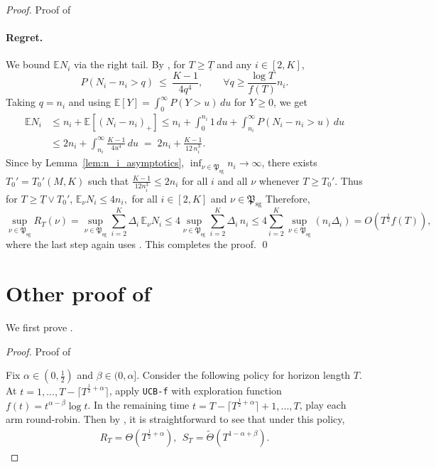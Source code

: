 \documentclass[nonblindrev]{informs3_noinforms}
\newcommand{\E}{{\mathbb{E}}}
\begin{document}
\begin{proof}{Proof of }
\paragraph{Regret.}
We bound $\E N_i$ via the right tail. By , for $T\ge \underline T$ and
any $i\in[2, K]$,
\[
P(N_i-n_i>q)\ \le\ \frac{K-1}{4q^4},
\qquad \forall q\ge \frac{\log T}{f(T)}n_i.
\]
Taking $q=n_i$ and using $\E[Y]=\int_0^\infty P(Y>u)\,du$ for $Y\ge 0$, we get
\begin{align*}
\E N_i
&\le n_i + \E[(N_i-n_i)_+]
 \le n_i + \int_0^{n_i} 1\,du + \int_{n_i}^{\infty} P(N_i-n_i>u)\,du \\
&\le 2n_i + \int_{n_i}^{\infty} \frac{K-1}{4u^4}\,du  \;=\;2n_i + \frac{K-1}{12\,n_i^3}.
\end{align*}
Since by Lemma~\ref{lem:n_i_asymptotics}, $\inf_{\nu\in\mathfrak{P}_{\text{sg}}}n_i\to\infty$, there exists $T_0'=T_0'( M, K)$ such that $\frac{K-1}{12n_i^3}\le 2n_i$ for all $i$ and all $\nu$ whenever $T\ge T_0'$. Thus for $T\ge \underline T\vee T_0'$, $\E_{\nu} N_i \le 4n_i,$ for all $i\in[2, K]$ and $\nu \in \mathfrak{P}_{\text{sg}}$ Therefore,
\[
\sup_{\nu\in\mathfrak{P}_{\text{sg}}} R_T(\nu)
=\sup_{\nu\in\mathfrak{P}_{\text{sg}}}\sum_{i=2}^K \Delta_i\,\E_{\nu} N_i
\le 4\sup_{\nu\in\mathfrak{P}_{\text{sg}}}\sum_{i=2}^K \Delta_i\,n_i
\le 4\sum_{i=2}^K \sup_{\nu\in\mathfrak{P}_{\text{sg}}}(n_i\Delta_i)
=O\!\left(T^{\frac12}f(T)\right),
\]
where the last step again uses . This completes the proof. \qed
\end{proof}







\section{Other proof of }\label{sec:pareto_other_proofs}
We first prove .
\begin{proof}{Proof of }

Fix $\alpha\in(0,\frac{1}{2})$ and $\beta\in(0,\alpha]$. Consider the following policy for horizon length $T$. At $t=1,...,T-\lceil T^{\frac{1}{2}+\alpha}\rceil$, apply \texttt{UCB-f} with exploration function $f(t)=t^{\alpha-\beta}\log t$. In the remaining time $t=T-\lceil T^{\frac{1}{2}+\alpha}\rceil+1,...,T$, play each arm round-robin. Then by , it is straightforward to see that under this policy, 
    \begin{align*}
        R_T=\Theta(T^{\frac{1}{2}+\alpha}), \ \ S_T=\tilde \Theta(T^{1-\alpha+\beta}).
    \end{align*}
\end{proof}
\end{document}
